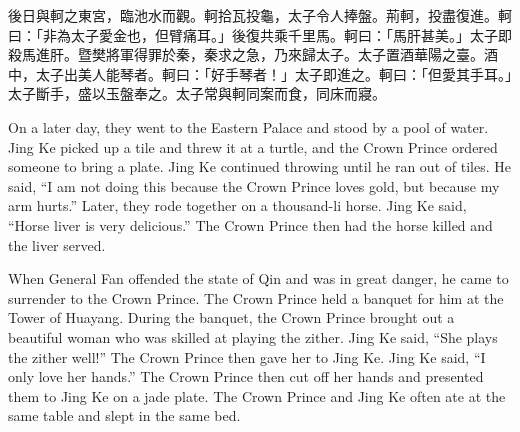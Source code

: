 \documentclass[12pt]{book}
\begin{document}
\Columns
\begin{pairs}
\begin{Rightside}
\begin{chinese}
\beginnumbering
\pstart
後日與軻之東宮，臨池水而觀。軻拾瓦投龜，太子令人捧盤。荊軻，投盡復進。軻曰：「非為太子愛金也，但臂痛耳。」後復共乘千里馬。軻曰：「馬肝甚美。」太子即殺馬進肝。暨樊將軍得罪於秦，秦求之急，乃來歸太子。太子置酒華陽之臺。酒中，太子出美人能琴者。軻曰：「好手琴者！」太子即進之。軻曰：「但愛其手耳。」太子斷手，盛以玉盤奉之。太子常與軻同案而食，同床而寢。
\pend
\endnumbering
\end{chinese}
\end{Rightside}
\begin{Leftside}
\begin{fioesjfsoeifj}
\beginnumbering
\pstart
On a later day, they went to the Eastern Palace and stood by a pool of water. Jing Ke picked up a tile and threw it at a turtle, and the Crown Prince ordered someone to bring a plate. Jing Ke continued throwing until he ran out of tiles. He said, ``I am not doing this because the Crown Prince loves gold, but because my arm hurts.'' Later, they rode together on a thousand-li horse. Jing Ke said, ``Horse liver is very delicious.'' The Crown Prince then had the horse killed and the liver served.

When General Fan offended the state of Qin and was in great danger, he came to surrender to the Crown Prince. The Crown Prince held a banquet for him at the Tower of Huayang. During the banquet, the Crown Prince brought out a beautiful woman who was skilled at playing the zither. Jing Ke said, ``She plays the zither well!'' The Crown Prince then gave her to Jing Ke. Jing Ke said, ``I only love her hands.'' The Crown Prince then cut off her hands and presented them to Jing Ke on a jade plate. The Crown Prince and Jing Ke often ate at the same table and slept in the same bed.
\pend
\endnumbering
\end{fioesjfsoeifj}
\end{Leftside}
\end{pairs}
\Columns
\end{document}
